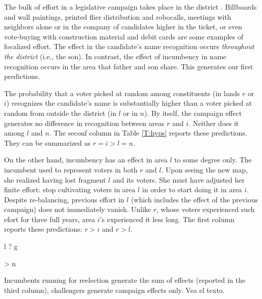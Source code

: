\documentclass[letter,12pt]{article}
\newcommand{\mc}{\multicolumn}
\begin{document}
The bulk of effort in a legislative campaign takes place in the district \citep{langston.nd}. Billboards and wall paintings, printed flier distribution and robocalls, meetings with neighbors alone or in the company of candidates higher in the ticket, or even vote-buying with construction material and debit cards are some examples of focalized effort. The effect in the candidate's name recognition occurs \emph{throughout the district} (i.e., the son). In contrast, the effect of incumbency in name recognition occurs in the area that father and son share. This generates our first predictions.

The probability that a voter picked at random among constituents (in lands $r$ or $i$) recognizes the candidate's name is substantially higher than a voter picked at random from outside the district (in $l$ or in $n$). By itself, the campaign effect generates no difference in recognition between areas $r$ and $i$. Neither does it among $l$ and $n$. The seconf column in Table \ref{T:hyps} reports these predictions. They can be summarized as $r=i>l=n$. 

On the other hand, incumbency has an effect in area $l$ to some degree only. The incumbent used to represent voters in both $r$ and $l$. Upon seeing the new map, she realized having lost fragment $l$ and its voters. She must have adjusted her finite effort: stop cultivating voters in area $l$ in order to start doing it in area $i$. Despite re-balancing, previous effort in $l$ (which includes the effect of the previous campaign) does not immediately vanish. Unlike $r$, whose voters experienced such efort for three full years, area $i$'s experienced it less long. The first column reports these predictions: $r>i$ and $r>l$. 

l ? g

> n

Incumbents running for reelection generate the sum of effects (reported in the third column), challengers generate campaign effects only. Vea el texto.

\end{document}
